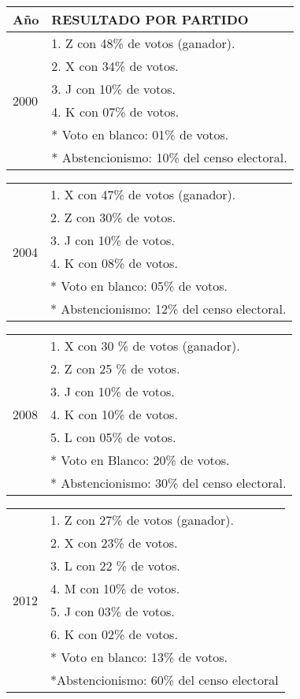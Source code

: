 \begin{enumerate}
 \begin{tabular}{p{1cm}||p{6cm}}
Año & RESULTADO POR PARTIDO \\
\hline  \hline
\multirow{6}{*}{2000} & 1. Z con 48\% de votos (ganador). \\
 & 2. X con 34\% de votos.\\
 & 3. J con 10\% de votos.\\
& 4. K con 07\% de votos.\\
& * Voto en blanco: 01\% de votos.	\\
	& * Abstencionismo: 10\% del censo electoral.\\
	\hline
\end{tabular} 
\begin{tabular}{p{1cm}||p{6cm}}
\hline
\multirow{6}{*}{2004}& 1. X con 47\% de votos (ganador).\\
& 2.  Z con 30\% de votos.\\
& 3.  J con 10\% de votos.\\
& 4.  K con 08\% de votos.\\
& * Voto en blanco: 05\% de votos.\\
& * Abstencionismo: 12\% del censo electoral.\\ 
\hline
\end{tabular} 
\begin{tabular}{p{1cm}||p{6cm}}
\hline
\multirow{7}{*}{2008}& 1. X con 30 \% de votos (ganador).\\
			&		 2.  Z con 25 \% de votos.\\
			&		 3.  J con 10\% de votos.\\
			&		 4. K con 10\% de votos.\\
			&		 5. L con 05\% de votos.\\
			&		 * Voto en Blanco: 20\% de votos.\\
			&		 * Abstencionismo: 30\% del censo electoral.\\
			\hline
\end{tabular} 
\begin{tabular}{p{1cm}||p{6cm}}
\hline
\multirow{8}{*}{2012}&1. Z con 27\% de votos (ganador).\\
			&		  2.  X con 23\% de votos.\\
			&		  3.  L con 22 \% de votos.\\
			&		  4.  M con 10\% de votos.\\
			&		  5.  J con 03\%  de votos.\\
			&		  6.  K con 02\% de votos.\\
			&		  * Voto en blanco: 13\% de votos.\\
			&		  *Abstencionismo: 60\% del censo electoral \\
			\hline \hline
\end{tabular}  


\end{enumerate}
